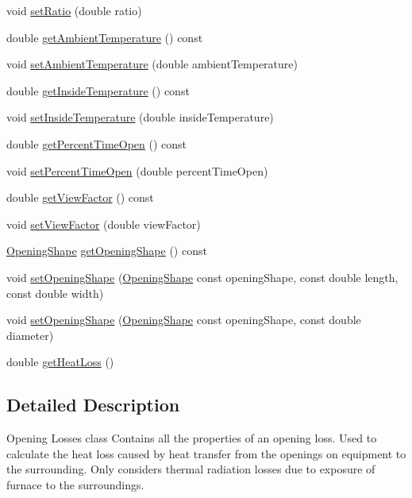 \begin{DoxyCompactItemize}
void \hyperlink{class_opening_losses_aab7f82f24511c37f0bc4b29cbc7239b5}{set\+Ratio} (double ratio)
\item 
double \hyperlink{class_opening_losses_a198f46508744d6943846ea95a9513a45}{get\+Ambient\+Temperature} () const
\item 
void \hyperlink{class_opening_losses_a3624c9fad2a413871b7324f7e957a5ae}{set\+Ambient\+Temperature} (double ambient\+Temperature)
\item 
double \hyperlink{class_opening_losses_abe930dab77b1c855503ee51fdf66c88a}{get\+Inside\+Temperature} () const
\item 
void \hyperlink{class_opening_losses_a895dcaa81bbb3dc823ec903480f05262}{set\+Inside\+Temperature} (double inside\+Temperature)
\item 
double \hyperlink{class_opening_losses_aeefc3790a569008ff2e804033a9efea3}{get\+Percent\+Time\+Open} () const
\item 
void \hyperlink{class_opening_losses_a889b6aa25bf6d8fc8fb284ec0c2a1625}{set\+Percent\+Time\+Open} (double percent\+Time\+Open)
\item 
double \hyperlink{class_opening_losses_ae6633fab7a941e00b9770bee6a3af34d}{get\+View\+Factor} () const
\item 
void \hyperlink{class_opening_losses_a4e6c6f1549e01cd4b82b7505e403d643}{set\+View\+Factor} (double view\+Factor)
\item 
\hyperlink{class_opening_losses_a57f9759b6fd72a1b75aa885800e26157}{Opening\+Shape} \hyperlink{class_opening_losses_a5046cd699178e4edca774d0d0da7965a}{get\+Opening\+Shape} () const
\item 
void \hyperlink{class_opening_losses_a19c28e02d1e736d74b3c82047d4d23b2}{set\+Opening\+Shape} (\hyperlink{class_opening_losses_a57f9759b6fd72a1b75aa885800e26157}{Opening\+Shape} const opening\+Shape, const double length, const double width)
\item 
void \hyperlink{class_opening_losses_afb0e0884b0e60db8cb6674228cf3aafe}{set\+Opening\+Shape} (\hyperlink{class_opening_losses_a57f9759b6fd72a1b75aa885800e26157}{Opening\+Shape} const opening\+Shape, const double diameter)
\item 
double \hyperlink{class_opening_losses_a38112eb408f72e252b42a68a41a25d0f}{get\+Heat\+Loss} ()
\end{DoxyCompactItemize}


\subsection{Detailed Description}
Opening Losses class Contains all the properties of an opening loss. Used to calculate the heat loss caused by heat transfer from the openings on equipment to the surrounding. Only considers thermal radiation losses due to exposure of furnace to the surroundings. 

